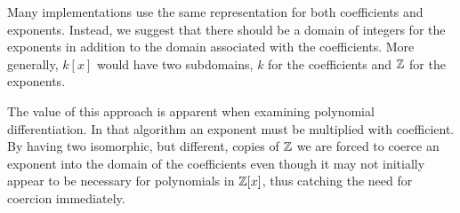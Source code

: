 Many implementations use the same representation for both coefficients
and exponents.  Instead, we suggest that there should be a domain of
integers for the exponents in addition to the domain associated with
the coefficients.  More generally, $k[x]$ would have two subdomains,
$k$ for the coefficients and ${\Bbb Z}$ for the exponents.

The value of this approach is apparent when examining polynomial
differentiation.  In that algorithm an exponent must be multiplied
with coefficient.  By having two isomorphic, but different, copies of
${\Bbb Z}$ we are forced to coerce an exponent into the domain of the
coefficients even though it may not initially appear to be necessary
for polynomials in ${\Bbb Z}[x]$, thus catching the need for coercion
immediately. 

